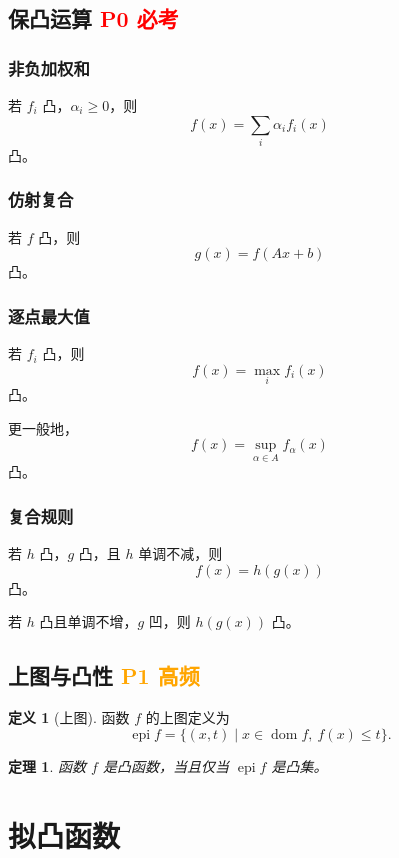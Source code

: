 \documentclass[11pt,a4paper]{ctexart}
\newcommand{\dom}{\operatorname{dom}}
\newcommand{\epi}{\operatorname{epi}}
\newcommand{\Pzero}{\textcolor{red}{\textbf{P0 必考}}}
\newcommand{\Pone}{\textcolor{orange}{\textbf{P1 高频}}}
\theoremstyle{definition}
\newtheorem{definition}{定义}[section]
\theoremstyle{plain}
\newtheorem{theorem}{定理}[section]
\theoremstyle{remark}
\begin{document}
\subsection{保凸运算 \Pzero}

\subsubsection*{非负加权和}

若 $f_i$ 凸，$\alpha_i\ge 0$，则
\[
    f(x)=\sum_i \alpha_i f_i(x)
\]
凸。

\subsubsection*{仿射复合}

若 $f$ 凸，则
\[
    g(x)=f(Ax+b)
\]
凸。

\subsubsection*{逐点最大值}

若 $f_i$ 凸，则
\[
    f(x)=\max_i f_i(x)
\]
凸。

更一般地，
\[
    f(x)=\sup_{\alpha\in A} f_\alpha(x)
\]
凸。

\subsubsection*{复合规则}

若 $h$ 凸，$g$ 凸，且 $h$ 单调不减，则
\[
    f(x)=h(g(x))
\]
凸。

若 $h$ 凸且单调不增，$g$ 凹，则 $h(g(x))$ 凸。

\subsection{上图与凸性 \Pone}

\begin{definition}[上图]
函数 $f$ 的上图定义为
\[
    \epi f = \{(x,t)\mid x\in\dom f,\ f(x)\le t\}.
\]
\end{definition}

\begin{theorem}
函数 $f$ 是凸函数，当且仅当 $\epi f$ 是凸集。
\end{theorem}

\section{拟凸函数}
\end{document}
